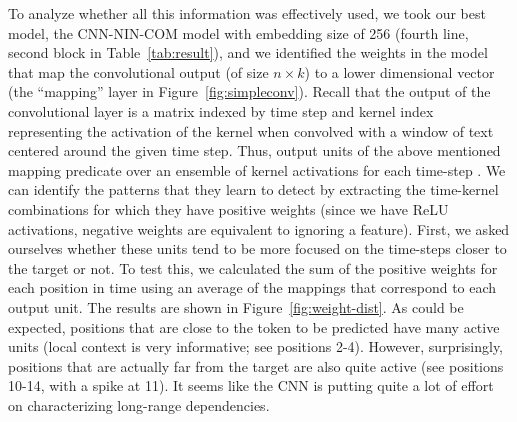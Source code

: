 To analyze whether all this information was effectively used,
 we took our best model, the CNN-NIN-COM model with
embedding size of 256 (fourth line, second block in
Table~\ref{tab:result}), and we identified the weights in the model
that map the convolutional output (of size $n \times k$) to a lower
dimensional vector (the ``mapping'' layer in
Figure~\ref{fig:simpleconv}). Recall that the output of the convolutional layer is
a matrix indexed by time step and kernel index representing the activation of
the kernel when convolved with a window of text centered around the given time step. Thus,
output units of the above mentioned mapping predicate over an ensemble of kernel activations for
each time-step . We can identify the
patterns that they learn to detect by extracting the time-kernel combinations
for which they have positive weights (since we have ReLU
activations, negative weights are equivalent to ignoring a
feature). 
First, we asked ourselves whether these units tend to be more
focused on the time-steps closer to the target or not. To test this,
we calculated the sum of the positive weights for each position in time using an average of the mappings that correspond to each output unit. %
The results are shown in
Figure~\ref{fig:weight-dist}. As could be expected, positions that are
close to the token to be predicted have many active units (local
context is very informative; see positions 2-4). However,
surprisingly, positions that are actually far from the target are also
quite active (see positions 10-14, with a spike at 11). It seems like the
CNN is putting quite a lot of effort on characterizing long-range
dependencies. %

